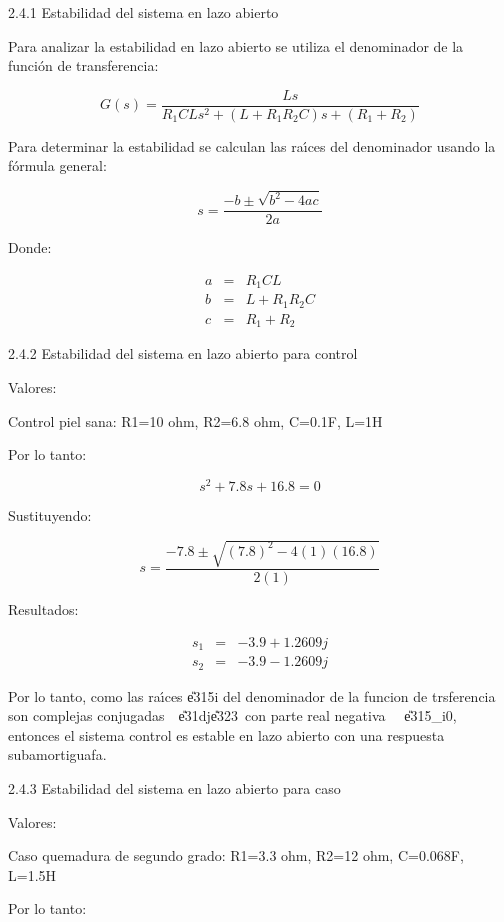 \documentclass{article}
\begin{document}
2.4.1 Estabilidad del sistema en lazo abierto 


Para analizar la estabilidad en lazo abierto se utiliza el denominador de la
funci\'{o}n de transferencia: 

\[
G(s)=\frac{Ls}{R_{1}CLs^{2}+(L+R_{1}R_{2}C)s+(R_{1}+R_{2})}
\]

\bigskip 

Para determinar la estabilidad se calculan las ra\'{\i}ces del denominador
usando la f\'{o}rmula general: 

\[
s=\frac{-b\pm \sqrt{b^{2}-4ac}}{2a}
\]

Donde:

\begin{eqnarray*}
a &=&R_{1}CL \\
b &=&L+R_{1}R_{2}C \\
c &=&R_{1}+R_{2}
\end{eqnarray*}

\bigskip 

2.4.2 Estabilidad del sistema en lazo abierto para control 

Valores:

Control piel sana: R1=10 ohm, R2=6.8 ohm, C=0.1F, L=1H

\bigskip 

Por lo tanto:

\[
s^{2}+7.8s+16.8=0
\]

Sustituyendo: 

\[
s=\frac{-7.8\pm \sqrt{(7.8)^{2}-4(1)(16.8)}}{2(1)}
\]

Resultados:

\begin{eqnarray*}
s_{1} &=&-3.9+1.2609j \\
s_{2} &=&-3.9-1.2609j
\end{eqnarray*}

\bigskip 

Por lo tanto, como las ra\'{\i}ces \U{e315}i del denominador de la funcion
de trsferencia son complejas conjugadas\ \ \U{e31d}\pm j\U{e323}\ con parte
real negativa \ \ \U{e315}_{i}\TEXTsymbol{<}0, entonces el sistema
control es estable en lazo abierto con una respuesta subamortiguafa. 

\bigskip 

2.4.3 Estabilidad del sistema en lazo abierto para caso 

Valores:

Caso quemadura de segundo grado: R1=3.3 ohm, R2=12 ohm, C=0.068F, L=1.5H

Por lo tanto:
\end{document}
